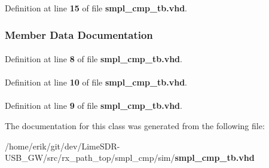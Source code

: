 Definition at line {\bf 15} of file {\bf smpl\+\_\+cmp\+\_\+tb.\+vhd}.



\subsubsection{Member Data Documentation}
\paragraph[{ieee}]{\hspace{0.3cm}{\ttfamily [Library]}}\label{classsmpl__cmp__tb_a0a6af6eef40212dbaf130d57ce711256}


Definition at line {\bf 8} of file {\bf smpl\+\_\+cmp\+\_\+tb.\+vhd}.

\paragraph[{numeric\+\_\+std}]{\hspace{0.3cm}{\ttfamily [Package]}}\label{classsmpl__cmp__tb_a2edc34402b573437d5f25fa90ba4013e}


Definition at line {\bf 10} of file {\bf smpl\+\_\+cmp\+\_\+tb.\+vhd}.

\paragraph[{std\+\_\+logic\+\_\+1164}]{\hspace{0.3cm}{\ttfamily [Package]}}\label{classsmpl__cmp__tb_acd03516902501cd1c7296a98e22c6fcb}


Definition at line {\bf 9} of file {\bf smpl\+\_\+cmp\+\_\+tb.\+vhd}.



The documentation for this class was generated from the following file\+:\begin{DoxyCompactItemize}
\item 
/home/erik/git/dev/\+Lime\+S\+D\+R-\/\+U\+S\+B\+\_\+\+G\+W/src/rx\+\_\+path\+\_\+top/smpl\+\_\+cmp/sim/{\bf smpl\+\_\+cmp\+\_\+tb.\+vhd}\end{DoxyCompactItemize}
